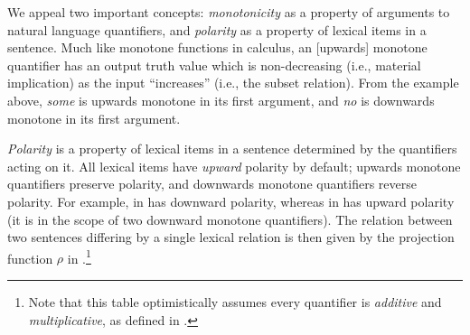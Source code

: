 We appeal two important concepts: \textit{monotonicity} as a
  property of arguments to natural language quantifiers,
  and \textit{polarity}
  as a property of lexical items in a sentence.
Much like monotone functions in calculus,
  an [upwards] monotone quantifier has an output truth value which is
  non-decreasing (i.e., material implication)
  as the input ``increases'' (i.e., the subset relation).
From the example above, \textit{some} is upwards monotone in its first
  argument, and \textit{no} is downwards monotone in its first argument.

%

\textit{Polarity} is
  a property of lexical items in a sentence determined by the
  quantifiers acting on it.
All lexical items have \textit{upward} polarity by default;
  upwards monotone quantifiers preserve polarity,
  and downwards monotone quantifiers reverse polarity.
For example,  in  has downward 
  polarity, whereas  in 
  has upward polarity
  (it is in the scope of two downward monotone quantifiers).
The relation between two sentences differing by a single lexical
  relation is then given by the projection function $\rho$ in
  .\footnote{
    Note that this table optimistically assumes every quantifier is
    \textit{additive} and \textit{multiplicative}, as defined
    in .
  }


